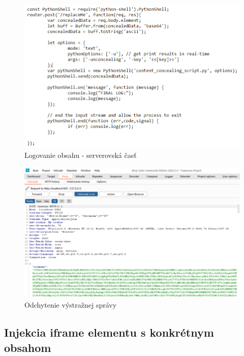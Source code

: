 \documentclass[conference, 11pt,slovak,a4paper,twoside]{IEEEtran}
\begin{document}
\begin{figure}[!t]  %
					\begin{center}
									\includegraphics[width=\linewidth]{fig/maskingServerCode.png}
									\caption{Logovanie obsahu - serverovská časť}
									\label{maskingServerCode}
					\end{center}
\end{figure}

\begin{figure}[!t]  %
					\begin{center}
									\includegraphics[width=\linewidth]{fig/burpSuite.png}
									\caption{Odchytenie výstražnej správy}
									\label{burpSuiteCapturing}
					\end{center}
\end{figure}



\subsection{Injekcia iframe elementu s konkrétnym obsahom}
\end{document}
